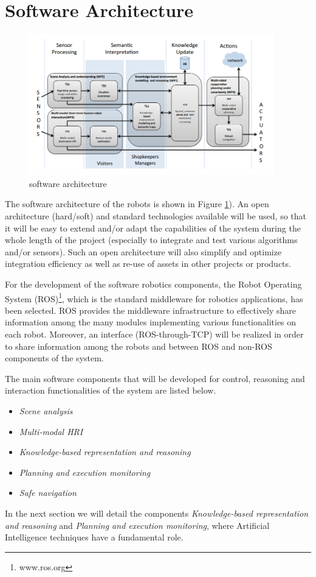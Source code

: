 \section{Software Architecture}

\begin{figure}
\centering
\includegraphics[width=0.95\textwidth]{fig/COACHES_swarch.png}
\caption{\coaches software architecture}
\label{fig:swarch}
\end{figure}

The software architecture of the \coaches robots is shown in Figure \ref{fig:swarch}).
An open architecture (hard/soft) and standard technologies available will be used, 
so that it will be easy to extend and/or adapt the capabilities of the system during the whole length of 
the  project  (especially  to  integrate  and  test  various  algorithms  and/or  sensors).  
Such an open architecture will also simplify and optimize integration efficiency as well as re-use of assets in other projects or products. 


For the development of the software robotics components, the Robot Operating System (ROS)\footnote{www.ros.org}, which is the standard middleware for robotics applications, has been selected.
ROS provides the middleware infrastructure to effectively share information among the many modules implementing various functionalities on each robot. Moreover, an interface (ROS-through-TCP) will be realized in order to share information among the robots and between ROS and non-ROS components of the system.

The main software components that will be developed for control, reasoning and interaction functionalities of the system are listed below.

\begin{itemize}
\item \emph{Scene analysis}

\item \emph{Multi-modal HRI}

\item \emph{Knowledge-based representation and reasoning}

\item \emph{Planning and execution monitoring}

\item \emph{Safe navigation}
\end{itemize}

In the next section we will detail the components 
\emph{Knowledge-based representation and reasoning} and
\emph{Planning and execution monitoring},
where Artificial Intelligence techniques have a fundamental role.



